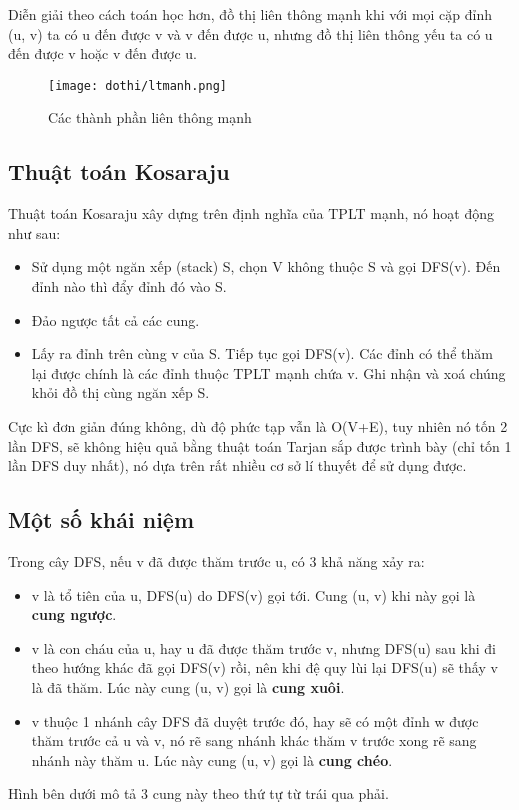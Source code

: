 Diễn giải theo cách toán học hơn, đồ thị liên thông mạnh khi với mọi cặp đỉnh (u, v) ta có u đến được v và v đến được u, nhưng đồ thị liên thông yếu ta có u đến được v hoặc v đến được u.

\begin{figure}[h]
    \texttt{[image: dothi/ltmanh.png]}
    \caption{Các thành phần liên thông mạnh}
\end{figure}

\subsection{Thuật toán Kosaraju}
Thuật toán Kosaraju xây dựng trên định nghĩa của TPLT mạnh, nó hoạt động như sau:
\begin{itemize}
    \item Sử dụng một ngăn xếp (stack) S, chọn V không thuộc S và gọi DFS(v). Đến đỉnh nào thì đẩy đỉnh đó vào S.
    \item Đảo ngược tất cả các cung.
    \item Lấy ra đỉnh trên cùng v của S. Tiếp tục gọi DFS(v). Các đỉnh có thể thăm lại được chính là các đỉnh thuộc TPLT mạnh chứa v. Ghi nhận và xoá chúng khỏi đồ thị cùng ngăn xếp S.
\end{itemize}
Cực kì đơn giản đúng không, dù độ phức tạp vẫn là O(V+E), tuy nhiên nó tốn 2 lần DFS, sẽ không hiệu quả bằng thuật toán Tarjan sắp được trình bày (chỉ tốn 1 lần DFS duy nhất), nó dựa trên rất nhiều cơ sở lí thuyết để sử dụng được.

\subsection{Một số khái niệm}
Trong cây DFS, nếu v đã được thăm trước u, có 3 khả năng xảy ra:
\begin{itemize}
    \item v là tổ tiên của u, DFS(u) do DFS(v) gọi tới. Cung (u, v) khi này gọi là \textbf{cung ngược}.
    \item v là con cháu của u, hay u đã được thăm trước v, nhưng DFS(u) sau khi đi theo hướng khác đã gọi DFS(v) rồi, nên khi đệ quy lùi lại DFS(u) sẽ thấy v là đã thăm. Lúc này cung (u, v) gọi là \textbf{cung xuôi}.
    \item v thuộc 1 nhánh cây DFS đã duyệt trước đó, hay sẽ có một đỉnh w được thăm trước cả u và v, nó rẽ sang nhánh khác thăm v trước xong rẽ sang nhánh này thăm u. Lúc này cung (u, v) gọi là \textbf{cung chéo}.
\end{itemize}
Hình bên dưới mô tả 3 cung này theo thứ tự từ trái qua phải.

